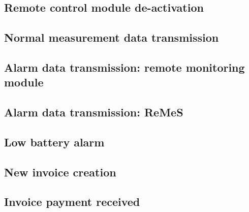 \subsection{Remote control module de-activation}
\label{uc-remote-module-deactivation}


\subsection{Normal measurement data transmission}
\label{uc-normal-measurement}


\subsection{Alarm data transmission: remote monitoring module}
\label{uc-alarm-transmission-module}


\subsection{Alarm data transmission: ReMeS}
\label{uc-alarm-transmission-remes}


\subsection{Low battery alarm}
\label{uc-low-battery-alarm}


\subsection{New invoice creation}
\label{uc-new-bill-creation}


\subsection{Invoice payment received}
\label{uc-bill-payment-received}
